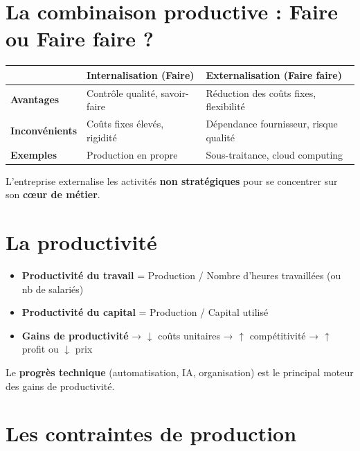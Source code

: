 \documentclass[11pt,a4paper]{article}
\begin{document}
\section*{La combinaison productive : Faire ou Faire faire ?}

\begin{center}
\begin{tabular}{|l|l|l|}
\hline
 & \textbf{Internalisation (Faire)} & \textbf{Externalisation (Faire faire)} \\
\hline
\textbf{Avantages} & Contrôle qualité, savoir-faire & Réduction des coûts fixes, flexibilité \\
\textbf{Inconvénients} & Coûts fixes élevés, rigidité & Dépendance fournisseur, risque qualité \\
\textbf{Exemples} & Production en propre & Sous-traitance, cloud computing \\
\hline
\end{tabular}
\end{center}

\begin{keybox}
L'entreprise externalise les activités \textbf{non stratégiques} pour se concentrer sur son \textbf{cœur de métier}.
\end{keybox}

\section*{La productivité}

\begin{itemize}
  \item \textbf{Productivité du travail} = Production / Nombre d'heures travaillées (ou nb de salariés)
  \item \textbf{Productivité du capital} = Production / Capital utilisé
  \item \textbf{Gains de productivité} → $\downarrow$ coûts unitaires → $\uparrow$ compétitivité → $\uparrow$ profit ou $\downarrow$ prix
\end{itemize}

\begin{keybox}
Le \textbf{progrès technique} (automatisation, IA, organisation) est le principal moteur des gains de productivité.
\end{keybox}

\section*{Les contraintes de production}
\end{document}
